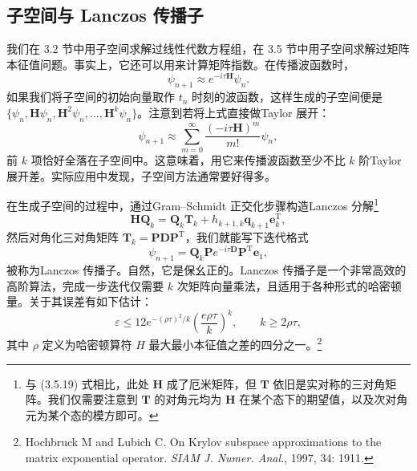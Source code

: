 \subsection{子空间与 Lanczos 传播子}

我们在 3.2 节中用子空间求解过线性代数方程组，在 3.5 节中用子空间求解过矩阵本征值问题。事实上，它还可以用来计算矩阵指数。在传播波函数时，
\begin{equation}
 \psi_{n+1}\approx e^{-i\tau\mathbf H}\psi_n.
\tag{6.2.25}
\end{equation}
如果我们将子空间的初始向量取作 $t_n$ 时刻的波函数，这样生成的子空间便是 $\{\psi_n,\mathbf H\psi_n,\mathbf H^2\psi_n,\ldots,\mathbf H^k\psi_n\}$。注意到若将上式直接做Taylor 展开：
\begin{equation}
 \psi_{n+1}\approx\sum_{m=0}^{\infty}\frac{(-i\tau\mathbf H)^m}{m!}\psi_n,
\tag{6.2.26}
\end{equation}
前 $k$ 项恰好全落在子空间中。这意味着，用它来传播波函数至少不比 $k$ 阶Taylor 展开差。实际应用中发现，子空间方法通常要好得多。

在生成子空间的过程中，通过Gram--Schmidt 正交化步骤构造Lanczos 分解\footnote{与 (3.5.19) 式相比，此处 $\mathbf H$ 成了厄米矩阵，但 $\mathbf T$ 依旧是实对称的三对角矩阵。我们仅需要注意到 $\mathbf T$ 的对角元均为 $\mathbf H$ 在某个态下的期望值，以及次对角元为某个态的模方即可。}
\begin{equation}
 \mathbf H\mathbf Q_k=\mathbf Q_k\mathbf T_k+h_{k+1,k}\bm q_{k+1}\bm e_k^\mathrm T,
\tag{6.2.27}
\end{equation}
然后对角化三对角矩阵 $\mathbf T_k=\mathbf P\mathbf D\mathbf P^\mathrm T$，我们就能写下迭代格式
\begin{equation}
 \psi_{n+1}=\mathbf Q_k\mathbf P e^{-i\tau\mathbf D}\mathbf P^\mathrm T\bm e_1,
\tag{6.2.28}
\end{equation}
被称为Lanczos 传播子。自然，它是保幺正的。Lanczos 传播子是一个非常高效的高阶算法，完成一步迭代仅需要 $k$ 次矩阵向量乘法，且适用于各种形式的哈密顿量。关于其误差有如下估计：
\begin{equation}
 \varepsilon\le12e^{-(\rho\tau)^2/k}\left(\frac{e\rho\tau}{k}\right)^k,\qquad k\ge2\rho\tau,
\tag{6.2.29}
\end{equation}
其中 $\rho$ 定义为哈密顿算符 $H$ 最大最小本征值之差的四分之一。\footnote{Hochbruck M and Lubich C. On Krylov subspace approximations to the matrix exponential operator. \emph{SIAM J. Numer. Anal.}, 1997, 34: 1911.}


